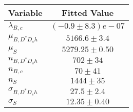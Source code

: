 \begin{tabular}[t]{lc}
\hline
Variable &Fitted Value\\
\hline\hline
$\lambda_{B,c}$&$(-0.9\pm8.3)e-07$\\
\hline
$\mu_{B, D^* D_s h}$&$5166.6\pm3.4$\\
\hline
$\mu_S$&$5279.25\pm0.50$\\
\hline
$n_{B, D^* D_s h}$&$702\pm34$\\
\hline
$n_{B,c}$&$70\pm41$\\
\hline
$n_S$&$1444\pm35$\\
\hline
$\sigma_{B, D^* D_s h}$&$27.5\pm2.4$\\
\hline
$\sigma_S$&$12.35\pm0.40$\\
\hline
\end{tabular}